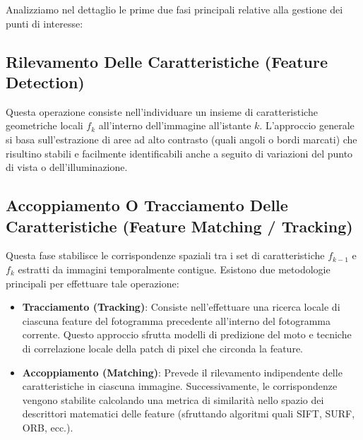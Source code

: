 ﻿\documentclass[11pt, a4paper]{article}
\begin{document}
\begin{algorithm}[H]
\DontPrintSemicolon
\caption{Pipeline dell'Odometria Visuale}
\label{alg:vo_pipeline}
\end{algorithm}

Analizziamo nel dettaglio le prime due fasi principali relative alla gestione dei punti di interesse:

\subsection{Rilevamento Delle Caratteristiche (Feature Detection)}
Questa operazione consiste nell'individuare un insieme di caratteristiche geometriche locali $f_k$ all'interno dell'immagine all'istante $k$. L'approccio generale si basa sull'estrazione di aree ad alto contrasto (quali angoli o bordi marcati) che risultino stabili e facilmente identificabili anche a seguito di variazioni del punto di vista o dell'illuminazione.

\subsection{Accoppiamento O Tracciamento Delle Caratteristiche (Feature Matching / Tracking)}
Questa fase stabilisce le corrispondenze spaziali tra i set di caratteristiche $f_{k-1}$ e $f_k$ estratti da immagini temporalmente contigue. Esistono due metodologie principali per effettuare tale operazione:
\begin{itemize}
    \item \textbf{Tracciamento (Tracking)}: Consiste nell'effettuare una ricerca locale di ciascuna feature del fotogramma precedente all'interno del fotogramma corrente. Questo approccio sfrutta modelli di predizione del moto e tecniche di correlazione locale della patch di pixel che circonda la feature.
    \item \textbf{Accoppiamento (Matching)}: Prevede il rilevamento indipendente delle caratteristiche in ciascuna immagine. Successivamente, le corrispondenze vengono stabilite calcolando una metrica di similarità nello spazio dei descrittori matematici delle feature (sfruttando algoritmi quali SIFT, SURF, ORB, ecc.).
\end{itemize}
\end{document}
